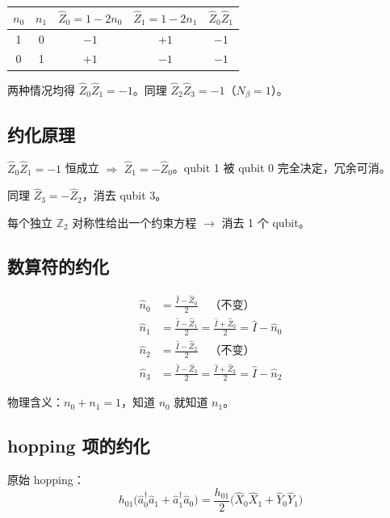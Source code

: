 \documentclass[11pt,a4paper]{article}
\begin{document}
\begin{center}
\begin{tabular}{ccccc}
  \toprule
  $n_0$ & $n_1$ & $\hat{Z}_0 = 1-2n_0$ & $\hat{Z}_1 = 1-2n_1$ & $\hat{Z}_0\hat{Z}_1$ \\
  \midrule
  1 & 0 & $-1$ & $+1$ & $-1$ \\
  0 & 1 & $+1$ & $-1$ & $-1$ \\
  \bottomrule
\end{tabular}
\end{center}

两种情况均得 $\hat{Z}_0\hat{Z}_1 = -1$。同理 $\hat{Z}_2\hat{Z}_3 = -1$（$N_\beta=1$）。

\subsection{约化原理}

$\hat{Z}_0\hat{Z}_1 = -1$ 恒成立 $\Rightarrow$ $\hat{Z}_1 = -\hat{Z}_0$。qubit 1 被 qubit 0 完全决定，冗余可消。

同理 $\hat{Z}_3 = -\hat{Z}_2$，消去 qubit 3。

每个独立 $\mathbb{Z}_2$ 对称性给出一个约束方程 $\to$ 消去 1 个 qubit。

\subsection{数算符的约化}

\begin{align}
  \hat{n}_0 &= \frac{\hat{I}-\hat{Z}_0}{2} \quad\text{（不变）} \\
  \hat{n}_1 &= \frac{\hat{I}-\hat{Z}_1}{2} = \frac{\hat{I}+\hat{Z}_0}{2} = \hat{I} - \hat{n}_0 \\
  \hat{n}_2 &= \frac{\hat{I}-\hat{Z}_2}{2} \quad\text{（不变）} \\
  \hat{n}_3 &= \frac{\hat{I}-\hat{Z}_3}{2} = \frac{\hat{I}+\hat{Z}_2}{2} = \hat{I} - \hat{n}_2
\end{align}

物理含义：$n_0 + n_1 = 1$，知道 $n_0$ 就知道 $n_1$。

\subsection{hopping 项的约化}

原始 hopping：
\begin{equation}
  h_{01}\big(\hat{a}_0^\dagger\hat{a}_1 + \hat{a}_1^\dagger\hat{a}_0\big)
  = \frac{h_{01}}{2}\big(\hat{X}_0\hat{X}_1 + \hat{Y}_0\hat{Y}_1\big)
\end{equation}
\end{document}
